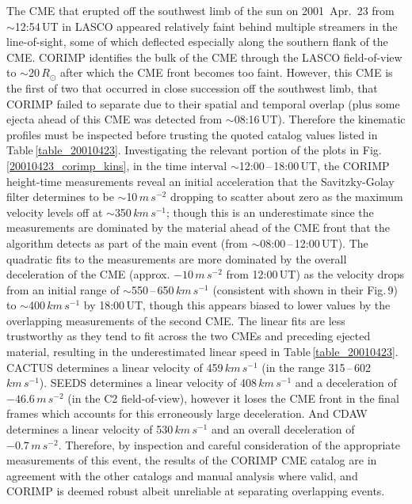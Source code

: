 \documentclass[referee,a4paper,12pt,traditabstract]{swsc}
\begin{document}
\begin{linenumbers}
The CME that erupted off the southwest limb of the sun on 2001~Apr.~23 from $\sim$12:54\,UT in LASCO appeared relatively faint behind multiple streamers in the line-of-sight, some of which deflected especially along the southern flank of the CME. CORIMP identifies the bulk of the CME through the LASCO field-of-view to $\sim$20\,$R_\odot$ after which the CME front becomes too faint. However, this CME is the first of two that occurred in close succession off the southwest limb, that CORIMP failed to separate due to their spatial and temporal overlap (plus some ejecta ahead of this CME was detected from $\sim$08:16\,UT). Therefore the kinematic profiles must be inspected before trusting the quoted catalog values listed in Table\,\ref{table_20010423}. Investigating the relevant portion of the plots in Fig.\,\ref{20010423_corimp_kins}, in the time interval $\sim$12:00\,--\,18:00\,UT, the CORIMP height-time measurements reveal an initial acceleration that the Savitzky-Golay filter determines to be $\sim$10\,$m\,s^{-2}$ dropping to scatter about zero as the maximum velocity levels off at $\sim$350\,$km\,s^{-1}$; though this is an underestimate since the measurements are dominated by the material ahead of the CME front that the algorithm detects as part of the main event (from $\sim$08:00\,--\,12:00\,UT). The quadratic fits to the measurements are more dominated by the overall deceleration of the CME (approx. $-10\,m\,s^{-2}$ from 12:00\,UT) as the velocity drops from an initial range of $\sim$550\,--\,650\,$km\,s^{-1}$ (consistent with \citealt{2009A&A...495..325B} shown in their Fig.\,9) to $\sim$400\,$km\,s^{-1}$ by 18:00\,UT, though this appears biased to lower values by the overlapping measurements of the second CME. The linear fits are less trustworthy as they tend to fit across the two CMEs and preceding ejected material, resulting in the underestimated  linear speed in Table\,\ref{table_20010423}. CACTUS determines a linear velocity of 459$\,km\,s^{-1}$ (in the range 315\,--\,602\,$km\,s^{-1}$). SEEDS determines a linear velocity of 408$\,km\,s^{-1}$ and a deceleration of $-46.6\,m\,s^{-2}$ (in the C2 field-of-view), however it loses the CME front in the final frames which accounts for this erroneously large deceleration. And CDAW determines a linear velocity of 530$\,km\,s^{-1}$ and an overall deceleration of $-0.7\,m\,s^{-2}$. Therefore, by inspection and careful consideration of the appropriate measurements of this event, the results of the CORIMP CME catalog are in agreement with the other catalogs and manual analysis where valid, and CORIMP is deemed robust albeit unreliable at separating overlapping events.




\end{linenumbers}
\end{document}
